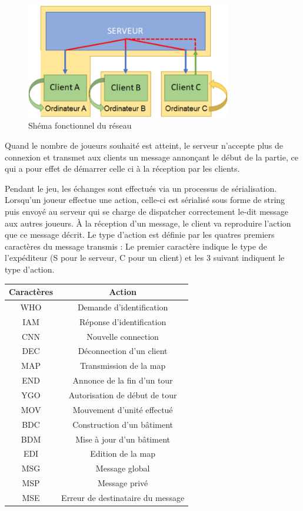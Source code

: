 \documentclass[12pt]{report}
\begin{document}
\begin{figure}[H]
    \centering
    \includegraphics[width=0.8\textwidth]{shema_multi}
    \caption{Shéma fonctionnel du réseau}
\end{figure}

Quand le nombre de joueurs souhaité est atteint, le serveur n'accepte plus de connexion et transmet aux clients un message annonçant le début de la partie, ce qui a pour effet de démarrer celle ci à la réception par les clients.

Pendant le jeu, les échanges sont effectués via un processus de sérialisation. Lorsqu’un joueur effectue une action, celle-ci est sérialisé sous forme de string puis envoyé au serveur qui se charge de dispatcher correctement le-dit message aux autres joueurs. À la réception d’un message, le client va reproduire l’action que ce message décrit. Le type d’action est définie par les quatres premiers caractères du message transmis : Le premier caractère indique le type de l’expéditeur (S pour le serveur, C pour un client) et les 3 suivant indiquent le type d’action.

\begin{center}
	\begin{tabular}{c|c}
		\toprule
		\textbf{Caractères}  & \textbf{Action}\\ 
		\midrule
		WHO & Demande d’identification \\
		IAM & Réponse d'identification \\
		CNN & Nouvelle connection \\
		DEC & Déconnection d’un client \\
		MAP & Transmission de la map \\
		END & Annonce de la fin d’un tour \\
		YGO & Autorisation de début de tour\\
		MOV & Mouvement d’unité effectué\\
		BDC & Construction d’un bâtiment\\
		BDM & Mise à jour d’un bâtiment\\
		EDI & Edition de la map\\
		MSG & Message global\\
		MSP & Message privé\\
		MSE & Erreur de destinataire du message\\
		\bottomrule
	\end{tabular}
\end{center}
\end{document}

